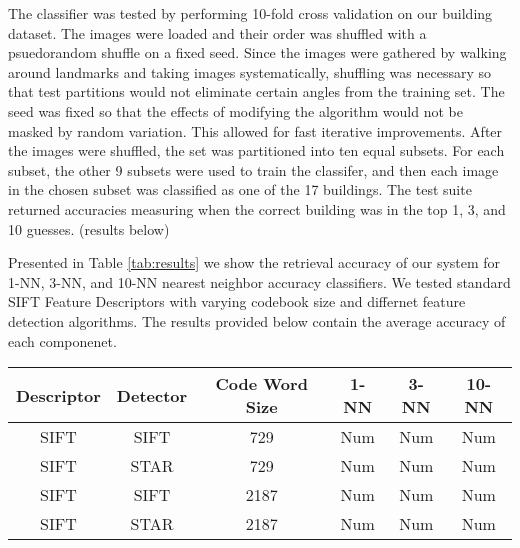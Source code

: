 The classifier was tested by performing 10-fold cross validation on our building dataset. 
The images were loaded and their order was shuffled with a psuedorandom shuffle on a fixed seed. 
Since the images were gathered by walking around landmarks and taking images systematically, shuffling was necessary so that test partitions would not eliminate certain angles from the training set. 
The seed was fixed so that the effects of modifying the algorithm would not be masked by random variation. This allowed for fast iterative improvements. After the images were shuffled, the set was partitioned into ten equal subsets. 
For each subset, the other 9 subsets were used to train the classifer, and then  each image in the chosen subset was classified as one of the 17 buildings. 
The test suite returned accuracies measuring when the correct building was in the top 1, 3, and 10 guesses. (results below)


Presented in Table \ref{tab:results} we show the retrieval accuracy of our system for 1-NN, 3-NN, and 10-NN nearest neighbor accuracy classifiers.
We tested standard SIFT Feature Descriptors with varying codebook size and differnet feature detection algorithms.
The results provided below contain the average accuracy of each componenet.

\begin{figure*}[ht!]
\label{tab:results}
\centering
\begin{tabular}{| c | c | c | c | c | c |}
\hline
Descriptor & Detector & Code Word Size & 1-NN & 3-NN & 10-NN\\ \hline
SIFT & SIFT & 729 & Num & Num & Num \\ \hline
SIFT & STAR & 729 & Num & Num & Num \\ \hline
SIFT & SIFT & 2187 & Num & Num & Num \\ \hline
SIFT & STAR & 2187 & Num & Num & Num\\ \hline
\end{tabular}
\vspace*{10pt}
\caption{Retrieval Accuracy}
\end{figure*}